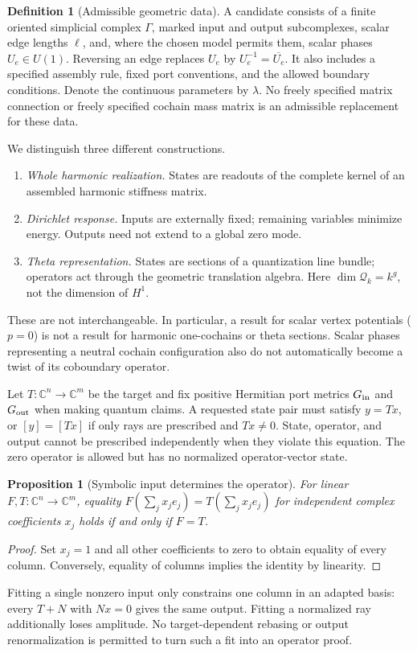 \documentclass[11pt]{article}
\newtheorem{proposition}[theorem]{Proposition}
\theoremstyle{definition}
\newtheorem{definition}[theorem]{Definition}
\newcommand{\C}{\mathbb C}
\begin{document}
\begin{definition}[Admissible geometric data]
A candidate consists of a finite oriented simplicial complex $\Gamma$,
marked input and output subcomplexes, scalar edge lengths $\ell$, and,
where the chosen model permits them, scalar phases $U_e\in U(1)$.
Reversing an edge replaces $U_e$ by $U_e^{-1}=\overline{U_e}$.
It also includes a specified assembly rule, fixed port conventions, and
the allowed boundary conditions. Denote the continuous parameters by
$\lambda$. No freely specified matrix connection or freely specified
cochain mass matrix is an admissible replacement for these data.
\end{definition}

We distinguish three different constructions.
\begin{enumerate}[nosep]
\item \emph{Whole harmonic realization.} States are readouts of the
complete kernel of an assembled harmonic stiffness matrix.
\item \emph{Dirichlet response.} Inputs are externally fixed; remaining
variables minimize energy. Outputs need not extend to a global zero mode.
\item \emph{Theta representation.} States are sections of a quantization
line bundle; operators act through the geometric translation algebra.
Here $\dim\mathcal Q_k=k^g$, not the dimension of $H^1$.
\end{enumerate}
These are not interchangeable. In particular, a result for scalar vertex
potentials ($p=0$) is not a result for harmonic one-cochains or theta
sections. Scalar phases representing a neutral cochain configuration
also do not automatically become a twist of its coboundary operator.

Let $T:\C^n\to\C^m$ be the target and fix positive Hermitian port metrics
$G_{\rm in}$ and $G_{\rm out}$ when making quantum claims. A requested
state pair must satisfy $y=Tx$, or $[y]=[Tx]$ if only rays are prescribed
and $Tx\ne0$. State, operator, and output cannot be prescribed
independently when they violate this equation. The zero operator is
allowed but has no normalized operator-vector state.

\begin{proposition}[Symbolic input determines the operator]\label{prop:coeff}
For linear $F,T:\C^n\to\C^m$, equality
$F(\sum_j x_j e_j)=T(\sum_j x_j e_j)$ for independent complex coefficients
$x_j$ holds if and only if $F=T$.
\end{proposition}
\begin{proof}
Set $x_j=1$ and all other coefficients to zero to obtain equality of
every column. Conversely, equality of columns implies the identity by
linearity.
\end{proof}
Fitting a single nonzero input only constrains one column in an adapted
basis: every $T+N$ with $Nx=0$ gives the same output. Fitting a normalized
ray additionally loses amplitude. No target-dependent rebasing or output
renormalization is permitted to turn such a fit into an operator proof.
\end{document}
